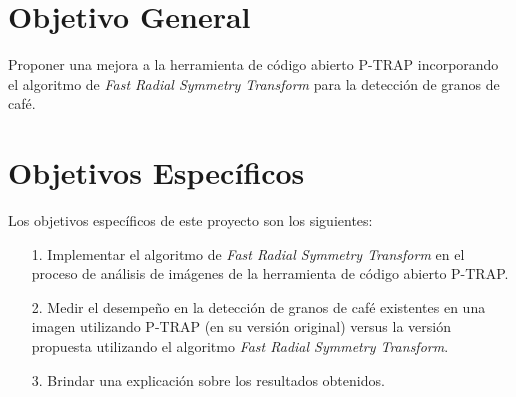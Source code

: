 \section{\textbf{Objetivo General}}
Proponer una mejora a la herramienta de c\'odigo abierto P-TRAP incorporando el algoritmo de \textit{Fast Radial Symmetry Transform} para la detecci\'on de granos de caf\'e.
\section{\textbf{Objetivos Espec\'ificos}}
Los objetivos espec\'ificos de este proyecto son los siguientes:
\begin{itemize}
\item [1.] Implementar el algoritmo de \textit{Fast Radial Symmetry Transform} en el proceso de an\'alisis de im\'agenes de la herramienta de c\'odigo abierto P-TRAP.
\item [2.] Medir el desempe\~no en la detecci\'on de granos de caf\'e existentes en una imagen utilizando P-TRAP (en su versi\'on original) versus la versi\'on propuesta utilizando el algoritmo \textit{Fast Radial Symmetry Transform}. 
\item [3.] Brindar una explicaci\'on sobre los resultados obtenidos.
\end{itemize}
